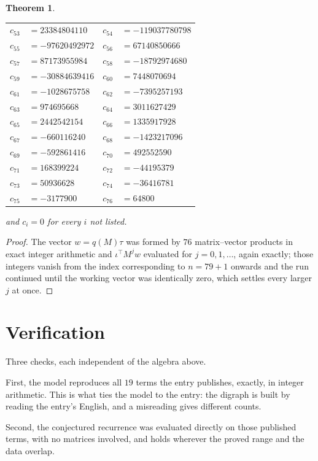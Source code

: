\documentclass[11pt,a4paper]{article}
\theoremstyle{plain}
\newtheorem{theorem}{Theorem}
\theoremstyle{definition}
\begin{document}
\begin{theorem}
\begin{center}
\begin{tabular}{r@{\,}l@{\qquad}r@{\,}l}
$c_{53}$ & $=23384804110$ & $c_{54}$ & $=-119037780798$ \\
$c_{55}$ & $=-97620492972$ & $c_{56}$ & $=67140850666$ \\
$c_{57}$ & $=87173955984$ & $c_{58}$ & $=-18792974680$ \\
$c_{59}$ & $=-30884639416$ & $c_{60}$ & $=7448070694$ \\
$c_{61}$ & $=-1028675758$ & $c_{62}$ & $=-7395257193$ \\
$c_{63}$ & $=974695668$ & $c_{64}$ & $=3011627429$ \\
$c_{65}$ & $=2442542154$ & $c_{66}$ & $=1335917928$ \\
$c_{67}$ & $=-660116240$ & $c_{68}$ & $=-1423217096$ \\
$c_{69}$ & $=-592861416$ & $c_{70}$ & $=492552590$ \\
$c_{71}$ & $=168399224$ & $c_{72}$ & $=-44195379$ \\
$c_{73}$ & $=50936628$ & $c_{74}$ & $=-36416781$ \\
$c_{75}$ & $=-3177900$ & $c_{76}$ & $=64800$ \\
\end{tabular}
\end{center}
and $c_i=0$ for every $i$ not listed.
\end{theorem}

\begin{proof}
The vector $w=q(M)\tau$ was formed by $76$ matrix--vector products in exact integer
arithmetic and $\iota^{\!\top}M^{j}w$ evaluated for $j=0,1,\dots$, again exactly; those
integers vanish from the index corresponding to $n=79+1$ onwards and the run continued
until the working vector was identically zero, which settles every larger $j$ at once.
\end{proof}

\section{Verification}

Three checks, each independent of the algebra above.

First, the model reproduces all $19$ terms the entry publishes, exactly, in integer
arithmetic. This is what ties the model to the entry: the digraph is built by reading the
entry's English, and a misreading gives different counts.

Second, the conjectured recurrence was evaluated directly on those published terms, with no
matrices involved, and holds wherever the proved range and the data overlap.
\end{document}
